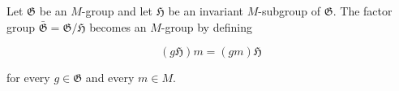 Let $\mathfrak{G}$ be an $M$-group and let $\mathfrak{H}$ be an invariant $M$-subgroup of $\mathfrak{G}$. The factor group $\bar{\mathfrak{G}} = \mathfrak{G}/\mathfrak{H}$ becomes an $M$-group by defining

$$(g\mathfrak{H})m = (gm)\mathfrak{H}$$

for every $g \in \mathfrak{G}$ and every $m \in M$.
